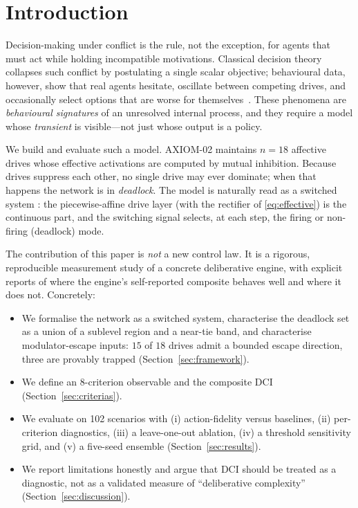 \documentclass[journal]{IEEEtran}
\newcommand{\DCI}{\mathrm{DCI}}
\begin{document}
\section{Introduction}
\label{sec:introduction}

Decision-making under conflict is the rule, not the exception, for agents
that must act while holding incompatible motivations. Classical decision
theory collapses such conflict by postulating a single scalar objective;
behavioural data, however, show that real agents hesitate, oscillate
between competing drives, and occasionally select options that are worse
for themselves~\cite{dostoevsky1864,tversky1974,loewenstein1996}. These
phenomena are \emph{behavioural signatures} of an unresolved internal
process, and they require a model whose \emph{transient} is visible---not
just whose output is a policy.

We build and evaluate such a model. AXIOM-02 maintains $n=18$ affective
drives whose effective activations are computed by mutual inhibition.
Because drives suppress each other, no single drive may ever dominate;
when that happens the network is in \emph{deadlock}. The model is
naturally read as a switched system \cite{liberzon2003,branicky1998,lin2009}: the piecewise-affine drive layer (with the
rectifier of \eqref{eq:effective}) is the continuous part, and the
switching signal selects, at each step, the firing or non-firing
(deadlock) mode.

The contribution of this paper is \emph{not} a new control law. It is a
rigorous, reproducible measurement study of a concrete deliberative
engine, with explicit reports of where the engine's self-reported
composite behaves well and where it does not. Concretely:

\begin{itemize}
\item We formalise the network as a switched system, characterise the
deadlock set as a union of a sublevel region and a near-tie band, and
characterise modulator-escape inputs: $15$ of $18$ drives admit a
bounded escape direction, three are provably trapped
(Section~\ref{sec:framework}).
\item We define an $8$-criterion observable and the composite $\DCI$
(Section~\ref{sec:criterias}).
\item We evaluate on 102 scenarios with (i) action-fidelity versus
baselines, (ii) per-criterion diagnostics, (iii) a leave-one-out
ablation, (iv) a threshold sensitivity grid, and (v) a five-seed
ensemble (Section~\ref{sec:results}).
\item We report limitations honestly and argue that $\DCI$ should be
treated as a diagnostic, not as a validated measure of ``deliberative
complexity'' (Section~\ref{sec:discussion}).
\end{itemize}
\end{document}
